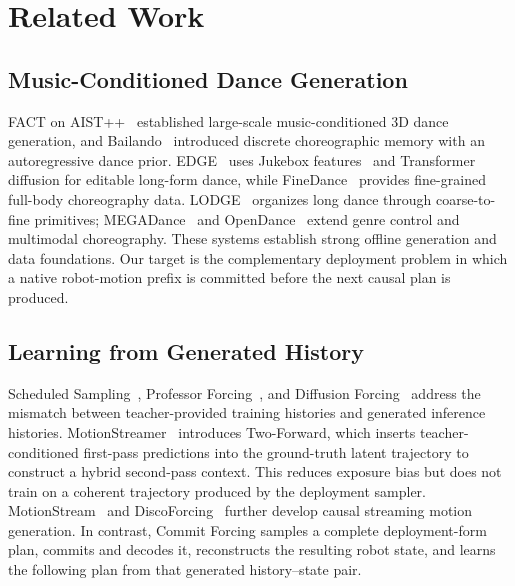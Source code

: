 \documentclass[conference]{IEEEtran}
\newcommand{\cof}{Commit Forcing}
\newif\ifshowpapertodos
\newcommand{\papertodo}[1]{%
\ifshowpapertodos
\par\smallskip\noindent
{\color{red!75!black}\textbf{TODO:} #1}
\smallskip\par
\fi}
\begin{document}
\papertodo{Insert the final d16 Commit-Forcing versus Teacher-Forcing result only after the two methods are matched in representation, parents, data, budget, seeds, and evaluation. Evaluate predicted-future music in a separate matched study.}

\section{Related Work}
\subsection{Music-Conditioned Dance Generation}
FACT on AIST++~\cite{li2021aist} established large-scale music-conditioned 3D dance generation, and Bailando~\cite{siyao2022bailando} introduced discrete choreographic memory with an autoregressive dance prior. EDGE~\cite{tseng2023edge} uses Jukebox features~\cite{dhariwal2020jukebox} and Transformer diffusion for editable long-form dance, while FineDance~\cite{li2023finedance} provides fine-grained full-body choreography data. LODGE~\cite{li2024lodge} organizes long dance through coarse-to-fine primitives; MEGADance~\cite{yang2025megadance} and OpenDance~\cite{zhang2026opendance} extend genre control and multimodal choreography. These systems establish strong offline generation and data foundations. Our target is the complementary deployment problem in which a native robot-motion prefix is committed before the next causal plan is produced.

\subsection{Learning from Generated History}
Scheduled Sampling~\cite{bengio2015scheduled}, Professor Forcing~\cite{lamb2016professor}, and Diffusion Forcing~\cite{chen2024diffusionforcing} address the mismatch between teacher-provided training histories and generated inference histories. MotionStreamer~\cite{xiao2025motionstreamer} introduces Two-Forward, which inserts teacher-conditioned first-pass predictions into the ground-truth latent trajectory to construct a hybrid second-pass context. This reduces exposure bias but does not train on a coherent trajectory produced by the deployment sampler. MotionStream~\cite{jiang2025motionstream} and DiscoForcing~\cite{ji2026discoforcing} further develop causal streaming motion generation. In contrast, \cof{} samples a complete deployment-form plan, commits and decodes it, reconstructs the resulting robot state, and learns the following plan from that generated history--state pair.
\end{document}
